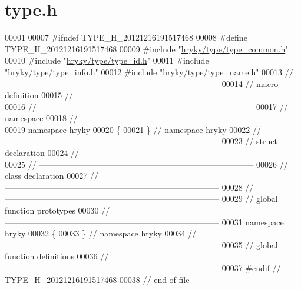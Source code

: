 \hypertarget{type_8h_source}{\section{type.\-h}
}

\begin{DoxyCode}
00001 
00007 \textcolor{preprocessor}{#ifndef TYPE\_H\_20121216191517468}
00008 \textcolor{preprocessor}{}\textcolor{preprocessor}{#define TYPE\_H\_20121216191517468}
00009 \textcolor{preprocessor}{}\textcolor{preprocessor}{#include "\hyperlink{type__common_8h}{hryky/type/type_common.h}"}
00010 \textcolor{preprocessor}{#include "\hyperlink{type__id_8h}{hryky/type/type_id.h}"}
00011 \textcolor{preprocessor}{#include "\hyperlink{type__info_8h}{hryky/type/type_info.h}"}
00012 \textcolor{preprocessor}{#include "\hyperlink{type__name_8h}{hryky/type/type_name.h}"}
00013 \textcolor{comment}{//
      ------------------------------------------------------------------------------}
00014 \textcolor{comment}{// macro definition}
00015 \textcolor{comment}{//
      ------------------------------------------------------------------------------}
00016 \textcolor{comment}{//
      ------------------------------------------------------------------------------}
00017 \textcolor{comment}{// namespace}
00018 \textcolor{comment}{//
      ------------------------------------------------------------------------------}
00019 \textcolor{keyword}{namespace }hryky
00020 \{
00021 \} \textcolor{comment}{// namespace hryky}
00022 \textcolor{comment}{//
      ------------------------------------------------------------------------------}
00023 \textcolor{comment}{// struct declaration}
00024 \textcolor{comment}{//
      ------------------------------------------------------------------------------}
00025 \textcolor{comment}{//
      ------------------------------------------------------------------------------}
00026 \textcolor{comment}{// class declaration}
00027 \textcolor{comment}{//
      ------------------------------------------------------------------------------}
00028 \textcolor{comment}{//
      ------------------------------------------------------------------------------}
00029 \textcolor{comment}{// global function prototypes}
00030 \textcolor{comment}{//
      ------------------------------------------------------------------------------}
00031 \textcolor{keyword}{namespace }hryky
00032 \{
00033 \} \textcolor{comment}{// namespace hryky}
00034 \textcolor{comment}{//
      ------------------------------------------------------------------------------}
00035 \textcolor{comment}{// global function definitions}
00036 \textcolor{comment}{//
      ------------------------------------------------------------------------------}
00037 \textcolor{preprocessor}{#endif // TYPE\_H\_20121216191517468}
00038 \textcolor{preprocessor}{}\textcolor{comment}{// end of file}
\end{DoxyCode}
